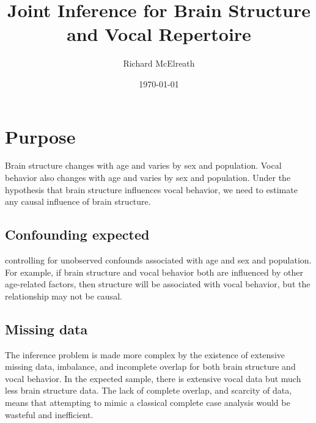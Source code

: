 \documentclass[reqno ,11pt]{amsart}
\begin{document}
\title[Brain Structure and Vocal Repertoire]{\large Joint Inference for Brain Structure and Vocal Repertoire}
\author{Richard McElreath}
\address{Department of Human Behavior, Ecology and Culture, Max Planck Institute for Evolutionary Anthropology, Deutscher Platz 6, 04103 Leipzig, Germany}
\date{\today}


\maketitle


\linenumbers
\modulolinenumbers[5]

\section{Purpose}

Brain structure changes with age and varies by sex and population. Vocal behavior also changes with age and varies by sex and population. Under the hypothesis that brain structure influences vocal behavior, we need to estimate any causal influence of brain structure.

\subsection{Confounding expected} controlling for unobserved confounds associated with age and sex and population. For example, if brain structure and vocal behavior both are influenced by other age-related factors, then structure will be associated with vocal behavior, but the relationship may not be causal. 

\subsection{Missing data} The inference problem is made more complex by the existence of extensive missing data, imbalance, and incomplete overlap for both brain structure and vocal behavior. In the expected sample, there is extensive vocal data but much less brain structure data. The lack of complete overlap, and scarcity of data, means that attempting to mimic a classical complete case analysis would be wasteful and inefficient.
\end{document}
